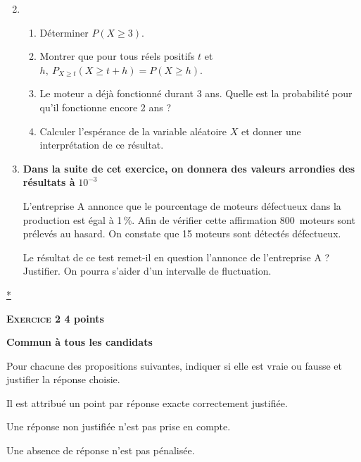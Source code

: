 \documentclass[10pt]{article}
\begin{document}
\begin{enumerate}
\setcounter{enumi}{1}

\item  
	\begin{enumerate}
		\item Déterminer $P(X \geqslant 3)$. 
		\item Montrer que pour tous réels positifs $t$ et $h,\: P_{X \geqslant t}(X \geqslant t + h) = P(X \geqslant  h)$. 
		\item Le moteur a déjà fonctionné durant 3 ans. Quelle est la probabilité pour qu'il fonctionne encore 2 ans ? 
		\item Calculer l'espérance de la variable aléatoire $X$ et donner une interprétation de ce résultat.
	\end{enumerate} 
\item \textbf{Dans la suite de cet exercice, on donnera des valeurs arrondies des résultats à \:} \boldmath $10^{-3}$\unboldmath
  
L'entreprise A annonce que le pourcentage de moteurs défectueux dans la production est égal à 1\,\%. Afin de vérifier cette affirmation $800$~moteurs sont prélevés au hasard. On constate que 15 moteurs sont détectés défectueux. 

Le résultat de ce test remet-il en question l'annonce de l'entreprise A ? Justifier. On pourra s'aider d'un intervalle de fluctuation. 
\end{enumerate}
\hyperlink{Index}{*}
\vspace{0,5cm}

\textbf{\textsc{Exercice 2} \hfill 4 points}
 
\textbf{Commun  à tous les candidats}

\medskip

Pour chacune des propositions suivantes, indiquer si elle est vraie ou fausse et justifier la réponse choisie. 

Il est attribué un point par réponse exacte correctement justifiée. 

Une réponse non justifiée n'est pas prise en compte. 

Une absence de réponse n'est pas pénalisée.

\medskip
 
\end{document}
